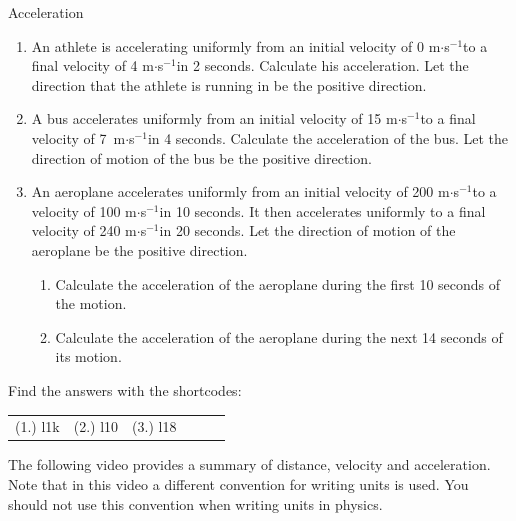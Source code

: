 \begin{exercises}{Acceleration }
            \nopagebreak \noindent
      \label{m38794*id62523}\begin{enumerate}[noitemsep, label=\textbf{\arabic*}. ] 
            \label{m38794*uid78}\item An athlete is accelerating uniformly from an initial velocity of 0 m$\ensuremath{\cdot}$s${}^{-1}$to a final velocity of 4 m$\ensuremath{\cdot}$s${}^{-1}$in 2 seconds. Calculate his acceleration. Let the direction that the athlete is running in be the positive direction.
\label{m38794*uid79}\item A bus accelerates uniformly from an initial velocity of 15 m$\ensuremath{\cdot}$s${}^{-1}$to a final velocity of 7~m$\ensuremath{\cdot}$s${}^{-1}$in 4 seconds. Calculate the acceleration of the bus. Let the direction of motion of the bus be the positive direction.
\label{m38794*uid80}\item An aeroplane accelerates uniformly from an initial velocity of 200 m$\ensuremath{\cdot}$s${}^{-1}$to a velocity of 100 m$\ensuremath{\cdot}$s${}^{-1}$in 10 seconds. It then accelerates uniformly to a final velocity of 240 m$\ensuremath{\cdot}$s${}^{-1}$in 20 seconds. Let the direction of motion of the aeroplane be the positive direction.
\label{m38794*id68889}\begin{enumerate}[noitemsep, label=\textbf{\alph*}. ] 
            \label{m38794*uid81}\item Calculate the acceleration of the aeroplane during the first 10 seconds of the motion.
\label{m38794*uid82}\item Calculate the acceleration of the aeroplane during the next 14 seconds of its motion.
\end{enumerate}
                \end{enumerate}
  \label{m38794**end}
\par {} Find the answers with the shortcodes:
 \par \begin{tabular}[h]{cccccc}
 (1.) l1k  &  (2.) l10  &  (3.) l18  & \end{tabular}
\end{exercises}
\label{m38794*eip-307}The following video provides a summary of distance, velocity and acceleration. Note that in this video a different convention for writing units is used. You should not use this convention when writing units in physics.
